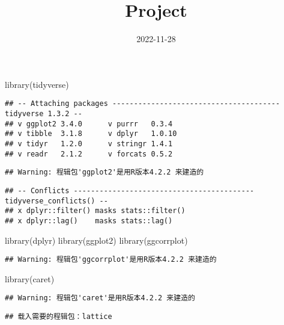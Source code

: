 \documentclass[
]{article}
\title{Project}
\author{}
\date{\vspace{-2.5em}2022-11-28}
\newenvironment{Shaded}{\begin{snugshade}}{\end{snugshade}}
\newcommand{\FunctionTok}[1]{\textcolor[rgb]{0.00,0.00,0.00}{#1}}
\newcommand{\NormalTok}[1]{#1}
\begin{document}
\maketitle

\begin{Shaded}
\begin{Highlighting}[]
\FunctionTok{library}\NormalTok{(tidyverse)}
\end{Highlighting}
\end{Shaded}

\begin{verbatim}
## -- Attaching packages --------------------------------------- tidyverse 1.3.2 --
## v ggplot2 3.4.0      v purrr   0.3.4 
## v tibble  3.1.8      v dplyr   1.0.10
## v tidyr   1.2.0      v stringr 1.4.1 
## v readr   2.1.2      v forcats 0.5.2
\end{verbatim}

\begin{verbatim}
## Warning: 程辑包'ggplot2'是用R版本4.2.2 来建造的
\end{verbatim}

\begin{verbatim}
## -- Conflicts ------------------------------------------ tidyverse_conflicts() --
## x dplyr::filter() masks stats::filter()
## x dplyr::lag()    masks stats::lag()
\end{verbatim}

\begin{Shaded}
\begin{Highlighting}[]
\FunctionTok{library}\NormalTok{(dplyr)}
\FunctionTok{library}\NormalTok{(ggplot2)}
\FunctionTok{library}\NormalTok{(ggcorrplot)}
\end{Highlighting}
\end{Shaded}

\begin{verbatim}
## Warning: 程辑包'ggcorrplot'是用R版本4.2.2 来建造的
\end{verbatim}

\begin{Shaded}
\begin{Highlighting}[]
\FunctionTok{library}\NormalTok{(caret)}
\end{Highlighting}
\end{Shaded}

\begin{verbatim}
## Warning: 程辑包'caret'是用R版本4.2.2 来建造的
\end{verbatim}

\begin{verbatim}
## 载入需要的程辑包：lattice
\end{verbatim}
\end{document}
